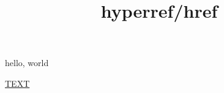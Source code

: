 \documentclass{amsart}
\title{hyperref/href}
\begin{document}
hello, world


\href{https://math.mit.edu/~drew/rk6.html#foo?x&5}{TEXT}
\end{document}
